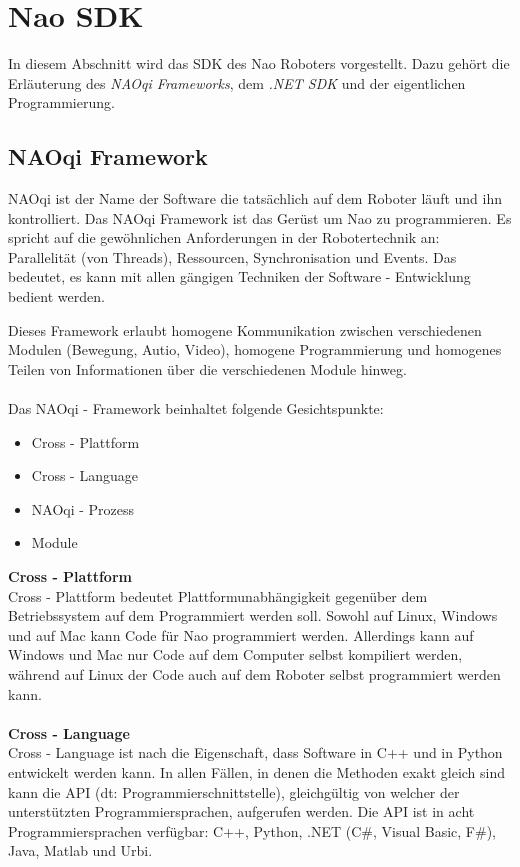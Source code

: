\section{Nao SDK}

In diesem Abschnitt wird das \ac{SDK} des Nao Roboters vorgestellt. Dazu gehört die Erläuterung des \textit{NAOqi Frameworks}, dem \textit{.NET SDK} und der eigentlichen Programmierung.

\subsection{NAOqi Framework}
NAOqi ist der Name der Software die tatsächlich auf dem Roboter läuft und ihn kontrolliert. Das NAOqi Framework ist das Gerüst um Nao zu programmieren. Es spricht auf die gewöhnlichen Anforderungen in der Robotertechnik an: Parallelität (von Threads), Ressourcen, Synchronisation und Events. Das bedeutet, es kann mit allen gängigen Techniken der Software - Entwicklung bedient werden. 

Dieses Framework erlaubt homogene Kommunikation zwischen verschiedenen Modulen (Bewegung, Autio, Video), homogene Programmierung und homogenes Teilen von Informationen über die verschiedenen Module hinweg.
\\
\\
\noindent
Das NAOqi - Framework beinhaltet folgende Gesichtspunkte:
\begin{itemize}
\item Cross - Plattform
\item Cross - Language
\item NAOqi - Prozess
\item Module
\end{itemize}

\noindent
\textbf{Cross - Plattform}
\\
Cross - Plattform bedeutet Plattformunabhängigkeit gegenüber dem Betriebssystem auf dem Programmiert werden soll. Sowohl auf Linux, Windows und auf Mac kann Code für Nao programmiert werden. Allerdings kann auf Windows und Mac nur Code auf dem Computer selbst kompiliert werden, während auf Linux der Code auch auf dem Roboter selbst programmiert werden kann.
\\
\\
\textbf{Cross - Language}
\\	
Cross - Language ist nach \cite{ws:naodocu} die Eigenschaft, dass Software in C++ und in Python entwickelt werden kann. In allen Fällen, in denen die Methoden exakt gleich sind kann die \ac{API} (dt: Programmierschnittstelle), gleichgültig von welcher der unterstützten Programmiersprachen, aufgerufen werden. Die \ac{API} ist in acht Programmiersprachen verfügbar: C++, Python, .NET (C\#, Visual Basic, F\#), Java, Matlab und Urbi.

